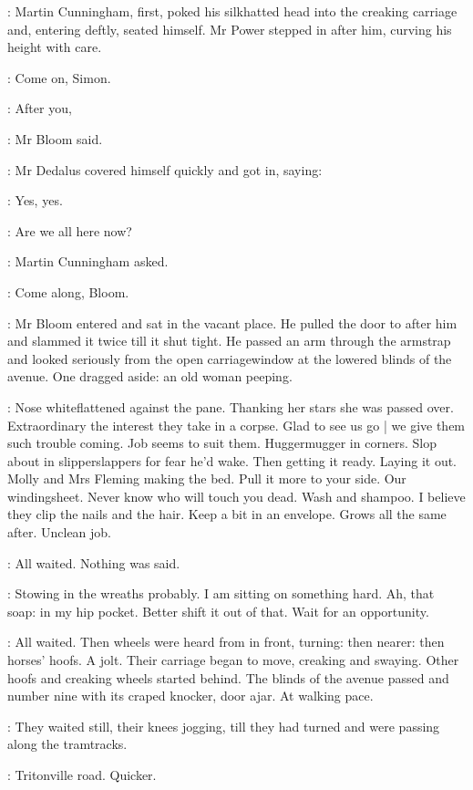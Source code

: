 :
Martin Cunningham, first,
poked his silkhatted head into the creaking carriage
and, entering deftly, seated himself.
Mr Power stepped in after him,
curving his height with care.

\power:
Come on, Simon.

\Bloom:
After you,

:
Mr Bloom said.

:
Mr Dedalus covered himself quickly and got in, saying:

\simon:
Yes, yes.

\cunningham:
Are we all here now?

:
Martin Cunningham asked.

\cunningham:
Come along, Bloom.

:
Mr Bloom entered and sat in the vacant place.
He pulled the door to after him
and slammed it twice till it shut tight.
He passed an arm through the armstrap
and looked seriously from the open carriagewindow
at the lowered blinds of the avenue.
One dragged aside:
an old woman peeping.

\BloomInt:
Nose whiteflattened against the pane.
Thanking her stars she was passed over.
Extraordinary the interest they take in a corpse.
Glad to see us go |
we give them such trouble coming.
Job seems to suit them.
Huggermugger in corners.
Slop about in slipperslappers for fear he'd wake.
Then getting it ready.
Laying it out.
Molly and Mrs Fleming making the bed.
Pull it more to your side.
Our windingsheet.
Never know who will touch you dead.
Wash and shampoo.
I believe they clip the nails and the hair.
Keep a bit in an envelope.
Grows all the same after.
Unclean job.

:
All waited.
Nothing was said.

\BloomInt:
Stowing in the wreaths probably.
I am sitting on something hard.
Ah, that soap:
in my hip pocket.
Better shift it out of that.
Wait for an opportunity.

:
All waited.
Then wheels were heard from in front, turning:
then nearer:
then horses' hoofs.
A jolt.
Their carriage began to move, creaking and swaying.
Other hoofs and creaking wheels started behind.
The blinds of the avenue passed
and number nine with its craped knocker, door ajar.
At walking pace.

:
They waited still, their knees jogging, till they had turned
and were passing along the tramtracks.

\BloomInt:
Tritonville road.
Quicker.

